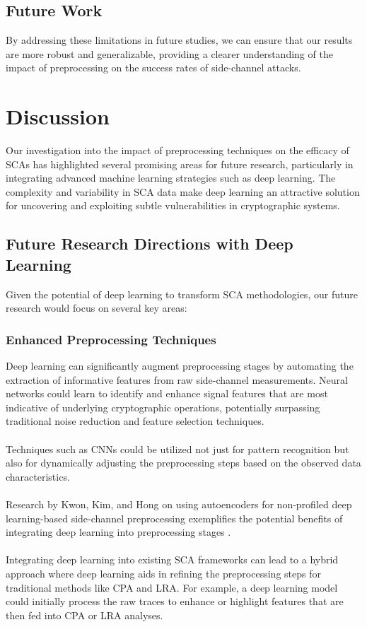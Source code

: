 \documentclass[a4paper,10pt]{article}
\begin{document}
\subsection{Future Work}
By addressing these limitations in future studies, we can ensure that our results are more robust and generalizable, providing a clearer understanding of the impact of preprocessing on the success rates of side-channel attacks.

\section{Discussion}
Our investigation into the impact of preprocessing techniques on the efficacy of SCAs has 
highlighted several promising areas for future research, particularly in integrating advanced machine learning strategies such as deep learning.
The complexity and variability in SCA data make deep learning an attractive solution for uncovering and exploiting subtle vulnerabilities in cryptographic systems.

\subsection{Future Research Directions with Deep Learning}
Given the potential of deep learning to transform SCA methodologies, our future research would focus on several key areas:

\subsubsection{Enhanced Preprocessing Techniques}
Deep learning can significantly augment preprocessing stages by automating the extraction of informative features from raw side-channel measurements.
Neural networks could learn to identify and enhance signal features that are most indicative of underlying cryptographic operations, potentially surpassing traditional noise reduction and feature selection techniques.
\\ \\
Techniques such as CNNs could be utilized not just for pattern recognition but also for dynamically adjusting the preprocessing steps based on the observed data characteristics.
\\ \\
Research by Kwon, Kim, and Hong on using autoencoders for non-profiled deep learning-based side-channel preprocessing exemplifies the potential benefits of integrating deep learning into preprocessing stages \cite{9400816}.
\\ \\ 
Integrating deep learning into existing SCA frameworks can lead to a hybrid approach where deep learning aids in refining the 
preprocessing steps for traditional methods like CPA and LRA. 
For example, a deep learning model could initially process the raw traces to enhance or highlight features that are then fed into CPA or LRA analyses.
\end{document}
